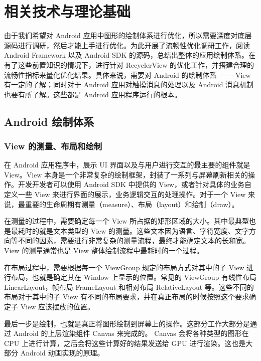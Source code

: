 \chapter{相关技术与理论基础}

由于我们希望对 Android 应用中图形的绘制体系进行优化，所以需要深度对底层源码进行调研，然后才能上手进行优化。为此开展了流畅性优化调研工作，阅读 Android Framework 以及 Android SDK 的源码，总结出整体的应用绘制体系。在有了这些前置知识的情况下，进行针对 RecyclerView 的优化工作，并搭建合理的流畅性指标来量化优化结果。具体来说，需要对 Android 的绘制体系 —— View 有一定的了解；同时对于 Android 应用对触摸消息的处理以及 Android 消息机制也要有所了解。这些都是 Android 应用程序运行的根本。

\section{Android 绘制体系}

\subsection{View 的测量、布局和绘制}

在 Android 应用程序中，展示 UI 界面以及与用户进行交互的最主要的组件就是 View。View 本身是一个非常复杂的绘制框架，封装了一系列与屏幕刷新相关的操作。开发开发者可以使用 Android SDK 中提供的 View，或者针对具体的业务自定义一些 View 来进行界面的展示，业务逻辑交互的处理操作。对于一个 View 来说，最重要的生命周期有测量（measure）、布局（layout）和绘制（draw）\cite{rountev2014static}。

在测量的过程中，需要确定每一个 View 所占据的矩形区域的大小。其中最典型也是最耗时的就是文本类型的 View 的测量。这些文本因为语言、字符宽度、文字方向等不同的因素，需要进行非常复杂的测量流程，最终才能确定文本的长和宽。View 的测量通常也是 View 整体绘制流程中最耗时的一个过程。

在布局过程中，需要根据每一个 ViewGroup 规定的布局方式对其中的子 View 进行布局，也就是确定其在 Window 上显示的位置。常见的 ViewGroup 有线性布局 LinearLayout，帧布局 FrameLayout 和相对布局 RelativeLayout 等。这些不同的布局对于其中的子 View 有不同的布局要求，并在真正布局的时候按照这个要求确定子 View 应该摆放的位置。

最后一步是绘制，也就是真正将图形绘制到屏幕上的操作。这部分工作大部分是通过 Android 的上层渲染组件 Canvas 来完成的。 Canvas 会将各种类型的图形在 CPU 上进行计算，之后会将这些计算好的结果发送给 GPU 进行渲染。这也是大部分 Android 动画实现的原理。

